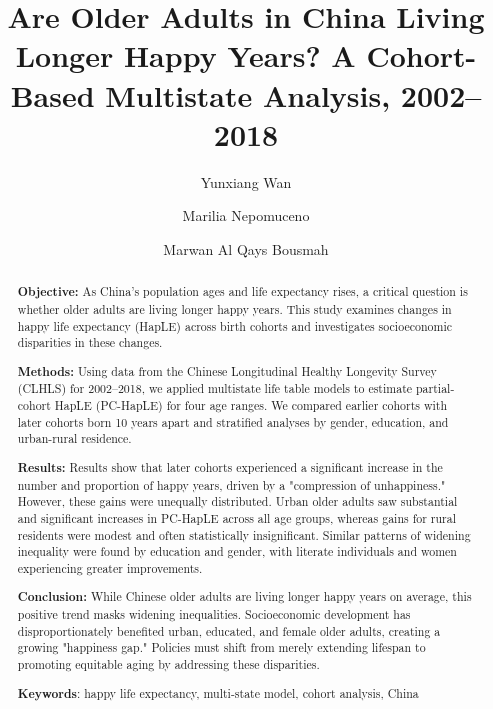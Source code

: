 \documentclass[12pt, a4paper]{article}
\title{\textbf{Are Older Adults in China Living Longer Happy Years? A Cohort-Based Multistate Analysis, 2002–2018}}
\author[*]{\small Yunxiang Wan\orcidlink{0009-0003-7482-7991}}
\author[1]{\small Marilia Nepomuceno}
\author[2]{\small Marwan Al Qays Bousmah}
\affil[1]{\small{Max Planck Institute for Demographic Research, Rostock, Germany, 18057}}
\affil[2]{\small{French Institute for Demographic Studies, Paris, France, 93300}}
\affil[*]{Corresponding author: \href{mailto:wan@demogr.mpg.de}{wan@demogr.mpg.de}}
\date{}
\begin{document}
\newpage

\maketitle

\begin{abstract}
  \noindent\textbf{Objective:} As China's population ages and life expectancy rises, a critical question is whether older adults are living longer happy years. This study examines changes in happy life expectancy (HapLE) across birth cohorts and investigates socioeconomic disparities in these changes.

  \noindent\textbf{Methods:} Using data from the Chinese Longitudinal Healthy Longevity Survey (CLHLS) for 2002–2018, we applied multistate life table models to estimate partial-cohort HapLE (PC-HapLE) for four age ranges. We compared earlier cohorts with later cohorts born 10 years apart and stratified analyses by gender, education, and urban-rural residence.

  \noindent\textbf{Results:} Results show that later cohorts experienced a significant increase in the number and proportion of happy years, driven by a "compression of unhappiness." However, these gains were unequally distributed. Urban older adults saw substantial and significant increases in PC-HapLE across all age groups, whereas gains for rural residents were modest and often statistically insignificant. Similar patterns of widening inequality were found by education and gender, with literate individuals and women experiencing greater improvements.

  \noindent\textbf{Conclusion:} While Chinese older adults are living longer happy years on average, this positive trend masks widening inequalities. Socioeconomic development has disproportionately benefited urban, educated, and female older adults, creating a growing "happiness gap." Policies must shift from merely extending lifespan to promoting equitable aging by addressing these disparities.
  \vspace{1em}

  \noindent\textbf{Keywords}: happy life expectancy, multi-state model, cohort analysis, China
\end{abstract}


\end{document}
